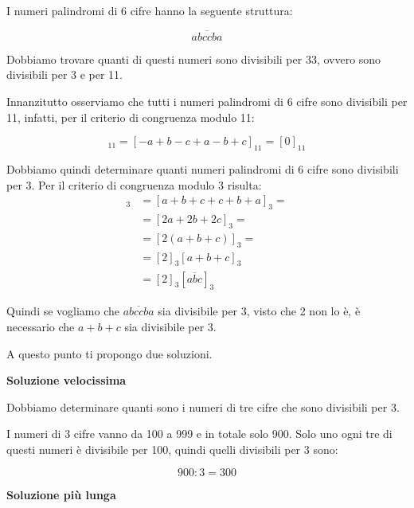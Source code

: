 \begin{soluzione}
    I numeri palindromi di 6 cifre hanno la seguente struttura:

    \begin{equation*}
        \overline{abccba}
    \end{equation*}

    Dobbiamo trovare quanti di questi numeri sono divisibili per 33, ovvero sono divisibili per 3 e per 11.

    Innanzitutto osserviamo che tutti i numeri palindromi di 6 cifre sono divisibili per 11, infatti, per il
    criterio di congruenza modulo 11:

    \begin{equation*}
        [\overline{abccba}]_{11} = [-a + b - c + a - b + c]_{11} = [0]_{11}
    \end{equation*}

    Dobbiamo quindi determinare quanti numeri palindromi di 6 cifre sono divisibili per 3.
    Per il criterio di congruenza modulo 3 risulta:
    \begin{align*}
        [\overline{abccba}]_3 &= [a + b + c + c + b + a]_3 = \\
        &= [2a + 2b + 2c]_3 = \\
        &= [2(a+b+c)]_3 = \\
        &= [2]_3[a + b + c]_3 \\
        &= [2]_3[\overline{abc}]_3
    \end{align*}

    Quindi se vogliamo che $\overline{abccba}$ sia divisibile per 3, visto che 2 non lo è, è necessario che $a + b + c$
    sia divisibile per 3.

    A questo punto ti propongo due soluzioni.

    \bigskip
    \textbf{Soluzione velocissima}

    Dobbiamo determinare quanti sono i numeri di tre cifre che sono divisibili per 3.

    I numeri di 3 cifre vanno da 100 a 999 e in totale solo 900.
    Solo uno ogni tre di questi numeri è divisibile per 100, quindi quelli divisibili per 3 sono:

    \begin{equation*}
        900 : 3 = 300
    \end{equation*}

    \bigskip
    \textbf{Soluzione più lunga}


\end{soluzione}
